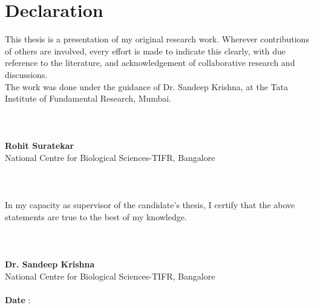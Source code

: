 \chapter[Declaration]{\centering Declaration}
This thesis is a presentation of my original research work. Wherever contributions of others are involved, every effort is made to indicate this clearly, with due reference to the literature, and acknowledgement of collaborative research and discussions. 
\\
The work was done under the guidance of Dr. Sandeep Krishna, at the Tata Institute of Fundamental Research, Mumbai.
\\\\\\\\
\null\hfill \textbf{ Rohit Suratekar}\\
\null\hfill National Centre for Biological Sciences-TIFR, Bangalore
\\\\\\\\
In my capacity as supervisor of the candidate’s thesis, I certify that the above statements are true to the best of my knowledge.
\\\\\\\\
\null\hfill \textbf{Dr. Sandeep Krishna}\\
\null\hfill  National Centre for Biological Sciences-TIFR, Bangalore\\
\\
\null\hfill \textbf{Date} : \qquad\qquad\qquad\qquad\qquad\\